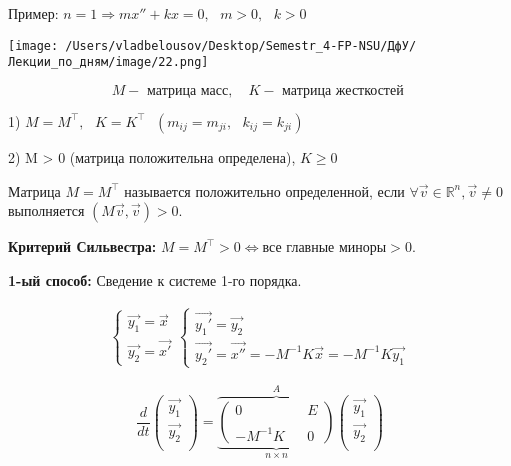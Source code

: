 \documentclass[12pt, a4paper]{report}
\begin{document}
Пример: \( n =1 \Rightarrow m x'' + kx = 0 , \text{ } m >0 , \text{ } k > 0 \) 

\begin{center}
    \texttt{[image: /Users/vladbelousov/Desktop/Semestr\_4-FP-NSU/ДфУ/Лекции\_по\_дням/image/22.png]}
\end{center}

\[ M -\text{ матрица масс} , \quad  K -\text{ матрица жесткостей } \] 

1) \( M = M^{\top} , \text{ }  K = K^{\top}   \text{ } (m_{ij}= m_{j i} ,\text{ } k_{ij} = k_{j i}   ) \) 

2) M > 0  (матрица положительна определена), \( K \geq 0 \) 

\begin{definition}
    Матрица \( M = M^{\top} \) называется положительно определенной, если \( \forall \vec{v } \in  \mathbb{R} ^{n } , \vec{v } \neq 0  \) выполняется \( (M\vec{v} , \vec{v} ) >0 \).  
\end{definition}

\textbf{Критерий Сильвестра: } \( M = M^{\top} > 0 \Leftrightarrow  \text{все главные миноры} > 0. \)

\textbf{1-ый способ:} Сведение к системе 1-го порядка. 

\[ \begin{aligned}
    \begin{cases}
        \vec{y_1 } = \vec{x } \\
        \vec{y_2 } = \vec{x '} 
    \end{cases}
    \begin{cases}
        \vec{y_1 '} = \vec{y_2} \\
        \vec{y_2  '} = \vec{x ''} = -M ^{-1} K \vec{x }  = - M ^{-1} K \vec{y_1}   
    \end{cases}
\end{aligned} \] 

\[ \frac{d}{dt} \begin{pmatrix}
\vec{y_1} \\
\vec{y_2} \\
\end{pmatrix} = \underbrace{\overbrace{\begin{pmatrix}
    0 &  & E\\
     &  & \\
    -M^{-1}K  &  & 0
    \end{pmatrix}}^{A}}_{n \times n}  \begin{pmatrix}
\vec{y_1} \\
\vec{y_2} \\
\end{pmatrix}   \] 
\end{document}

